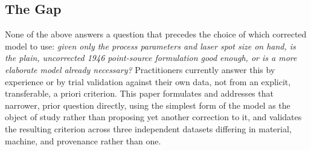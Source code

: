 \documentclass[12pt]{article}
\begin{document}
\subsection{The Gap}
None of the above answers a question that precedes the choice of which corrected model to use: \emph{given only the process parameters and laser spot size on hand, is the plain, uncorrected 1946 point-source formulation good enough, or is a more elaborate model already necessary?} Practitioners currently answer this by experience or by trial validation against their own data, not from an explicit, transferable, a priori criterion. This paper formulates and addresses that narrower, prior question directly, using the simplest form of the model as the object of study rather than proposing yet another correction to it, and validates the resulting criterion across three independent datasets differing in material, machine, and provenance rather than one.
\end{document}
